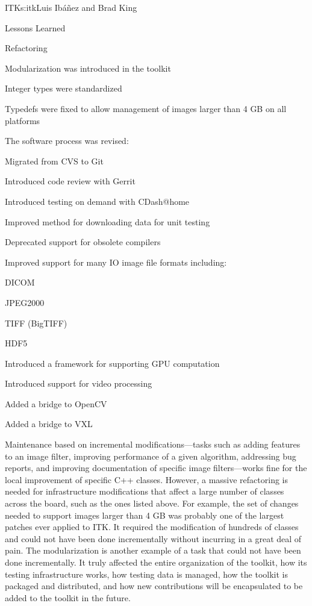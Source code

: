 \begin{aosachapter}{ITK}{s:itk}{Luis Ib\'{a}\~{n}ez and Brad King}
\begin{aosasect1}{Lessons Learned}
\begin{aosasect2}{Refactoring}
\begin{aosaitemize}
\item Modularization was introduced in the toolkit
\item Integer types were standardized
\item Typedefs were fixed to allow management of images larger than 4 GB on all platforms
\item The software process was revised:
  \begin{aosaitemize2}
    \item Migrated from CVS to Git
    \item Introduced code review with Gerrit
    \item Introduced testing on demand with CDash@home
    \item Improved method for downloading data for unit testing
  \end{aosaitemize2}
\item Deprecated support for obsolete compilers
\item Improved support for many IO image file formats including:
  \begin{aosaitemize2}
    \item DICOM
    \item JPEG2000
    \item TIFF (BigTIFF)
    \item HDF5
  \end{aosaitemize2}
\item Introduced a framework for supporting GPU computation
\item Introduced support for video processing
  \begin{aosaitemize2}
    \item Added a bridge to OpenCV
    \item Added a bridge to VXL
  \end{aosaitemize2}
\end{aosaitemize}

Maintenance based on incremental modifications---tasks such as adding
features to an image filter, improving performance of a given
algorithm, addressing bug reports, and improving documentation of
specific image filters---works fine for the local improvement of specific C++ 
classes. However, a massive refactoring is needed for
infrastructure modifications that affect a large number of classes
across the board, such as the ones listed above. For example,
the set of changes needed to support images larger
than 4 GB was probably one of the largest patches ever applied to ITK.
It required the modification of hundreds of classes and could not have
been done incrementally without incurring in a great deal of pain. The
modularization is another example of a task that could not have
been done incrementally. It truly affected the entire organization of
the toolkit, how its testing infrastructure works, how testing data
is managed, how the toolkit is packaged and distributed, and how new
contributions will be encapsulated to be added to the toolkit in the
future.


\end{aosasect2}
\end{aosasect1}
\end{aosachapter}
